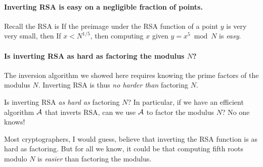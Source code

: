 \paragraph{Inverting RSA is easy on a negligible fraction of points.}
Recall the RSA is 
If the preimage under the RSA function of a point $y$ is very very small,
then 
If $x < N^{1/5}$, then computing $x$ given $y = x^5 \bmod N$ is \emph{easy}.


\paragraph{Is inverting RSA as hard as factoring the modulus $N$?}
The inversion algorithm we showed here requires knowing the prime factors
of the modulus $N$.
Inverting RSA is thus \emph{no harder than} factoring $N$.

Is inverting RSA \emph{as hard as} factoring $N$?
In particular, if we have an efficient algorithm $\mathcal{A}$ that inverts
RSA, can we use $\mathcal{A}$ to factor the modulus $N$?
No one knows!

Most cryptographers, I would guess, believe that inverting the RSA function
is as hard as factoring.
But for all we know, it could be that computing fifth roots modulo $N$ is \emph{easier}
than factoring the modulus.


